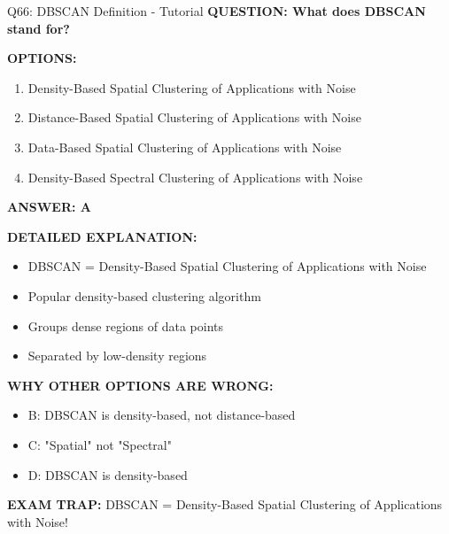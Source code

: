 \documentclass[8pt]{beamer}
\begin{document}
	\begin{frame}{Q66: DBSCAN Definition - Tutorial}
		\fontsize{6.5}{7.5}\selectfont
		\textbf{QUESTION: What does DBSCAN stand for?}
		
		\vspace{0.1cm}
		\textbf{OPTIONS:}
		\begin{enumerate}
			\item Density-Based Spatial Clustering of Applications with Noise
			\item Distance-Based Spatial Clustering of Applications with Noise
			\item Data-Based Spatial Clustering of Applications with Noise
			\item Density-Based Spectral Clustering of Applications with Noise
		\end{enumerate}
		
		\vspace{0.1cm}
		\textcolor{myblue}{\textbf{ANSWER: A}}
		
		\vspace{0.1cm}
		\textbf{DETAILED EXPLANATION:}
		\begin{itemize}
			\item DBSCAN = Density-Based Spatial Clustering of Applications with Noise
			\item Popular density-based clustering algorithm
			\item Groups dense regions of data points
			\item Separated by low-density regions
		\end{itemize}
		
		\vspace{0.1cm}
		\textcolor{myred}{\textbf{WHY OTHER OPTIONS ARE WRONG:}}
		\begin{itemize}
			\item \textcolor{myred}{B:} DBSCAN is density-based, not distance-based
			\item \textcolor{myred}{C:} "Spatial" not "Spectral"
			\item \textcolor{myred}{D:} DBSCAN is density-based
		\end{itemize}
		
		\textcolor{myred}{\textbf{EXAM TRAP:}} DBSCAN = \textcolor{myblue}{Density-Based Spatial Clustering of Applications with Noise}!
	\end{frame}
	
\end{document}
